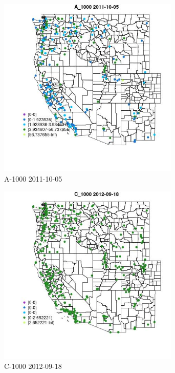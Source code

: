 \begin{figure} 
\centering  
\includegraphics[width=0.77\textwidth]{Code_Outputs/ML_input_report_ML_input_PM25_Step5_part_d_de_duplicated_aves_ML_input_MapObsA_10002011-10-05.jpg} 
\caption{\label{fig:ML_input_report_ML_input_PM25_Step5_part_d_de_duplicated_aves_ML_inputMapObsA_10002011-10-05}A-1000 2011-10-05} 
\end{figure} 
 

\begin{figure} 
\centering  
\includegraphics[width=0.77\textwidth]{Code_Outputs/ML_input_report_ML_input_PM25_Step5_part_d_de_duplicated_aves_ML_input_MapObsC_10002012-09-18.jpg} 
\caption{\label{fig:ML_input_report_ML_input_PM25_Step5_part_d_de_duplicated_aves_ML_inputMapObsC_10002012-09-18}C-1000 2012-09-18} 
\end{figure} 
 

